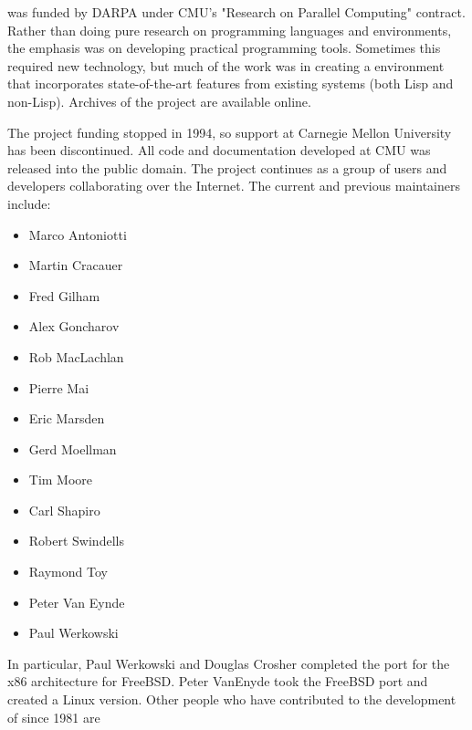 \cmucl{} was funded by DARPA under CMU's "Research on Parallel Computing"
contract. Rather than doing pure research on programming languages and
environments, the emphasis was on developing practical programming
tools. Sometimes this required new technology, but much of the work
was in creating a \clisp{} environment that incorporates
state-of-the-art features from existing systems (both Lisp and
non-Lisp). Archives of the project are available online.

The project funding stopped in 1994, so support at Carnegie Mellon
University has been discontinued. All code and documentation developed
at CMU was released into the public domain. The project continues as a
group of users and developers collaborating over the Internet. The
current and previous maintainers include:

\begin{itemize}
\item Marco Antoniotti
\item Martin Cracauer
\item Fred Gilham
\item Alex Goncharov
\item Rob MacLachlan
\item Pierre Mai
\item Eric Marsden
\item Gerd Moellman
\item Tim Moore
\item Carl Shapiro  
\item Robert Swindells
\item Raymond Toy
\item Peter Van Eynde
\item Paul Werkowski
\end{itemize}

In particular, Paul Werkowski and Douglas Crosher completed the port
for the x86 architecture for FreeBSD. Peter VanEnyde took the FreeBSD
port and created a Linux version. Other people who have contributed to
the development of \cmucl{} since 1981 are

